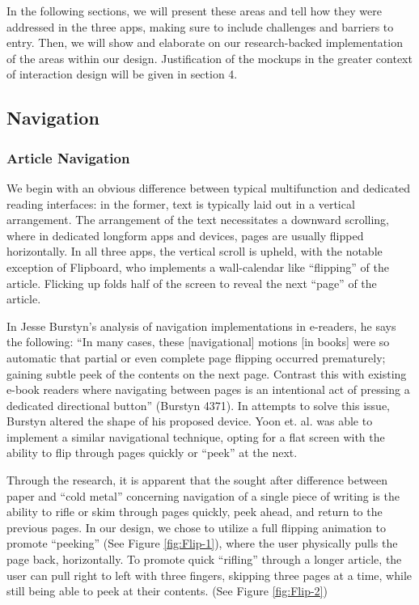 \documentclass[11pt, oneside]{article}   	%
\begin{document}
In the following sections, we will present these areas and tell how they were addressed in the three apps, making sure to include challenges and barriers to entry. Then, we will show and elaborate on our research-backed implementation of the areas within our design. Justification of the mockups in the greater context of interaction design will be given in section 4.

\subsection{Navigation}

\subsubsection{Article Navigation}
We begin with an obvious difference between typical multifunction and dedicated reading interfaces: in the former, text is typically laid out in a vertical arrangement. The arrangement of the text necessitates a downward scrolling, where in dedicated longform apps and devices, pages are usually flipped horizontally. In all three apps, the vertical scroll is upheld, with the notable exception of Flipboard, who implements a wall-calendar like ``flipping'' of the article. Flicking up folds half of the screen to reveal the next ``page'' of the article. 

In Jesse Burstyn's analysis of navigation implementations in e-readers, he says the following: ``In many cases, these [navigational] motions [in books] were so automatic that partial or even complete page flipping occurred prematurely; gaining subtle peek of the contents on the next page. Contrast this with existing e-book readers where navigating between pages is an intentional act of pressing a dedicated directional button'' (Burstyn 4371). In attempts to solve this issue, Burstyn altered the shape of his proposed device. Yoon et. al. was able to implement a similar navigational technique, opting for a flat screen with the ability to flip through pages quickly or ``peek'' at the next.

Through the research, it is apparent that the sought after difference between paper and ``cold metal'' concerning navigation of a single piece of writing is the ability to rifle or skim through pages quickly, peek ahead, and return to the previous pages. In our design, we chose to utilize a full flipping animation to promote ``peeking'' (See Figure \ref{fig:Flip-1}), where the user physically pulls the page back, horizontally. To promote quick ``rifling'' through a longer article, the user can pull right to left with three fingers, skipping three pages at a time, while still being able to peek at their contents. (See Figure \ref{fig:Flip-2})
\end{document}
